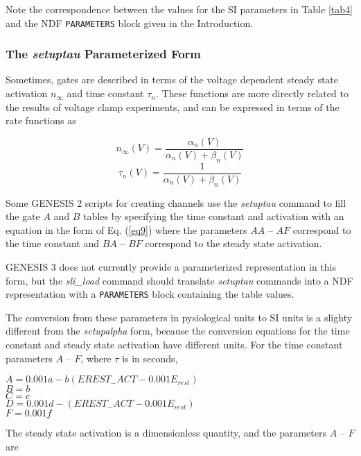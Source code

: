 \documentclass[12pt]{article}
\begin{document}
Note the correspondence between the values for the SI parameters in Table
\ref{tab4} and the NDF {\tt PARAMETERS} block given in the Introduction.

\subsubsection{The {\em setuptau} Parameterized Form}
\label{sec4-2}

Sometimes, gates are described in terms of the voltage dependent steady state
activation $n_\infty$ and time constant $\tau_n$.  These functions are more
directly related to the results of voltage clamp experiments, and can be
expressed in terms of the rate functions as

\begin{equation}
n_\infty(V) = \frac{ \alpha_n(V) }{ \alpha_n(V) + \beta_n(V) }
\label{eq11}
\end{equation}
\begin{equation}
\tau_n(V) = \frac{1}{\alpha_n(V) + \beta_n(V)}
\label{eq12}
\end{equation}


Some GENESIS 2 scripts for creating channels use the {\em setuptau} command
to fill the gate $A$ and $B$ tables by specifying the time constant and
activation with an equation in the form of Eq. (\ref{eq9}) where the
parameters $AA$ -- $AF$ correspond to the time constant and $BA$ -- $BF$
correspond to the steady state activation.

GENESIS 3 does not currently provide a parameterized representation in
this form, but the {\em sli\_load} command should  translate {\em setuptau}
commands into a NDF representation with a {\tt PARAMETERS} block containing
the table values.

The conversion from these parameters in pysiological units to SI units
is a slighty different from the {\em setupalpha} form, because the
conversion equations for the time constant and steady state activation
have different units.   For the time constant parameters $A$ -- $F$,
where $\tau$ is in seconds,

$A = 0.001 a - b (EREST_{-}ACT - 0.001 E_{rest})$ \\
$B = b$ \\
$C = c$ \\
$D = 0.001 d - (EREST_{-}ACT - 0.001 E_{rest})$ \\
$F = 0.001 f$

The steady state activation is a dimensionless quantity, and the
parameters $A$ -- $F$ are
\end{document}
